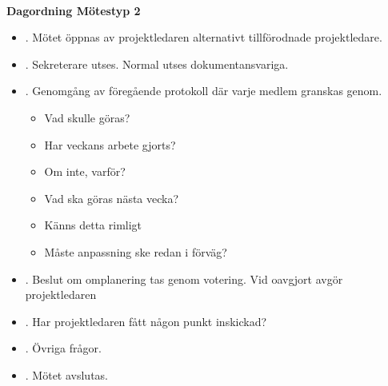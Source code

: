 \documentclass[titlepage, a4paper]{article}
\begin{document}
{\ }\vspace{5mm}

\begin{center}
  \textbf{\Huge Dagordning Mötestyp 2}
\end{center}

\vspace{10mm}

\begin{itemize}
\item{. Mötet öppnas av projektledaren alternativt tillförodnade projektledare.}
\item{. Sekreterare utses. Normal utses dokumentansvariga.}
\item{. Genomgång av föregående protokoll där varje medlem granskas genom.
\begin{itemize}
\item{Vad skulle göras?}
\item{Har veckans arbete gjorts?}
\item{Om inte, varför?}
\item{Vad ska göras nästa vecka?}
\item{Känns detta rimligt}
\item{Måste anpassning ske redan i förväg?}
\end{itemize}
}
\item{. Beslut om omplanering tas genom votering. Vid oavgjort avgör projektledaren}
\item{. Har projektledaren fått någon punkt inskickad?}
\item{. Övriga frågor.}
\item{. Mötet avslutas.}
\end{itemize}
\end{document}
